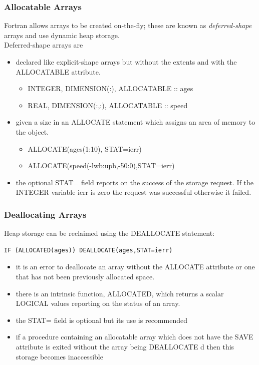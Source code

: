 \documentclass[11pt]{beamer}
\begin{document}
\begin{frame}[fragile]
\frametitle{Allocatable Arrays}

\footnotesize{
Fortran allows arrays to be created on-the-fly; these are known as \emph{deferred-shape} arrays and use dynamic heap storage. \\
Deferred-shape arrays are
\begin{itemize}
\item declared like explicit-shape arrays but without the extents and with the ALLOCATABLE attribute.
\begin{itemize}
\item INTEGER, DIMENSION(:), ALLOCATABLE :: ages
\item REAL, DIMENSION(:,:), ALLOCATABLE :: speed
 \end{itemize}
 \item given a size in an ALLOCATE statement which assigns an area of memory to the object.
\begin{itemize}
\item ALLOCATE(ages(1:10), STAT=ierr)
\item ALLOCATE(speed(-lwb:upb,-50:0),STAT=ierr)
 \end{itemize}
\item the optional STAT= field reports on the success of the storage request. If the INTEGER variable ierr is zero the request was successful otherwise it failed. 
 \end{itemize}
}

\end{frame}

\begin{frame}[fragile]
\frametitle{Deallocating Arrays}

\footnotesize{
Heap storage can be reclaimed using the DEALLOCATE statement:
 \begin{lstlisting}[style=Fortran]
IF (ALLOCATED(ages)) DEALLOCATE(ages,STAT=ierr)
 \end{lstlisting}

\begin{itemize}
\item it is an error to deallocate an array without the ALLOCATE attribute or one that has not been previously allocated space.
\item there is an intrinsic function, ALLOCATED, which returns a scalar LOGICAL values reporting on the status of an array. 
\item the STAT= field is optional but its use is recommended
\item if a procedure containing an allocatable array which does not have the SAVE attribute is exited without the array being DEALLOCATE d then this storage becomes inaccessible
 \end{itemize}
}

\end{frame}
\end{document}
